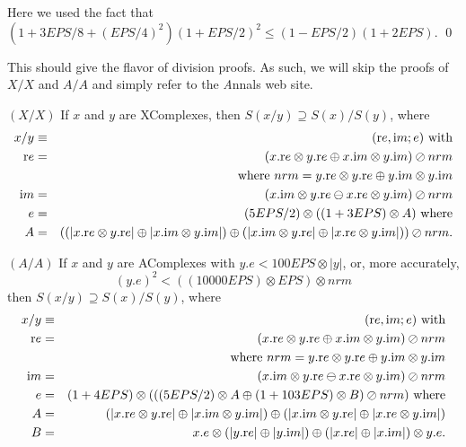 Here we used the fact that 
\hfill $(1 + 3EPS/8 + (EPS/4)^2)(1+EPS/2)^2 \le (1 - EPS/2)(1+ 2EPS).$ \hfill\qed
{}
 
This should give the flavor of division proofs.  As such, we will skip the proofs of $X/X$ and $A/A$ and simply refer to the
 {\textit Annals} web site.
\begin{proposition}\label{GMT 7.12}{$(X / X)$}
If $x$ and $y$ are {\textrm XComplexes,} then
$S(x / y) \supseteq S(x) / S(y)${\textrm ,} where
\begin{eqnarray*}
x  / y  &\equiv& ({\mathrm re},{\mathrm im};e)\hbox{ with}\\
{\mathrm re}& =& (x.{\mathrm re} \otimes y.{\mathrm re} \oplus x.{\mathrm im} \otimes y.{\mathrm im}) \oslash nrm\\
&&\hbox{ where $nrm = y.{\mathrm
re}
\otimes y.{\mathrm re} \oplus y.{\mathrm im} \otimes y.{\mathrm im}$}\\
{\mathrm im}& = &(x.{\mathrm im} \otimes y.{\mathrm re} \ominus x.{\mathrm re} \otimes y.{\mathrm im}) \oslash nrm\\
e& =& (5EPS/2) \otimes ((1
+  3EPS) \otimes A) \hbox{  where}\\
 A& =& 
((|x.{\mathrm re} \otimes y.{\mathrm re}| \oplus |x.{\mathrm im} \otimes y.{\mathrm im}|)
 \oplus 
 (|x.{\mathrm im} \otimes y.{\mathrm re}| \oplus |x.{\mathrm re} \otimes y.{\mathrm im}|))
\oslash nrm
.\end{eqnarray*}
\end{proposition}

\begin{proposition}\label{GMT 7.13}{$(A / A)$}
If $x$ and $y$ are {\textrm AComplexes} with 
$y.e < 100 EPS \otimes |y|${\textrm ,} or{\textrm ,} more accurately{\textrm ,}
$$(y.e)^2< ((10000 EPS) \otimes EPS)\otimes nrm$$ then
$S(x / y) \supseteq S(x) / S(y)${\textrm ,} where
\begin{eqnarray*}
x  / y & \equiv& ({\mathrm re},{\mathrm im};e)\hbox{ with}\\
{\mathrm re}& =& (x.{\mathrm re} \otimes y.{\mathrm re} \oplus x.{\mathrm im} \otimes y.{\mathrm im}) \oslash nrm\\
&&\hbox{ where $nrm = y.{\mathrm
re}
\otimes y.{\mathrm re} \oplus y.{\mathrm im} \otimes y.{\mathrm im}$}\\
{\mathrm im}& =& (x.{\mathrm im} \otimes y.{\mathrm re} \ominus x.{\mathrm re} \otimes y.{\mathrm im}) \oslash nrm\\
e& =& (1 + 4EPS)\otimes 
(
((5 EPS/2) \otimes A \oplus (1+103EPS) \otimes B)
\oslash nrm)\hbox{ where}\\
 A& =& (|x.{\mathrm re} \otimes y.{\mathrm re}| \oplus |x.{\mathrm im}\otimes y.{\mathrm im}|) 
 \oplus
(|x.{\mathrm im} \otimes y.{\mathrm re}| \oplus | x.{\mathrm re} \otimes y.{\mathrm im}|)\\
B& =& x.e\otimes(|y.{\mathrm re}|\oplus|y.{\mathrm im}|)
\oplus
   (|x.{\mathrm re}|\oplus|x.{\mathrm im}|)\otimes y.e.
\end{eqnarray*}
\end{proposition}

